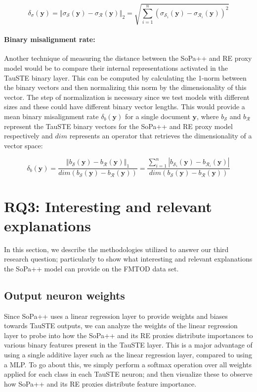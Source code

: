 \begin{equation}
  \delta_{\sigma}(\bm{y}) = \left\Vert \sigma_{\mathcal{S}}(\bm{y}) - \sigma_{\mathcal{R}}(\bm{y}) \right\Vert_{2} = \sqrt{\sum^n_{i=1} (\sigma_{\mathcal{S}_i}(\bm{y}) - \sigma_{\mathcal{R}_i}(\bm{y}))^2} 
\end{equation}

\paragraph{Binary misalignment rate:} Another technique of measuring the
distance between the SoPa++ and RE proxy model would be to compare their
internal representations activated in the TauSTE binary layer. This can be
computed by calculating the 1-norm between the binary vectors and then
normalizing this norm by the dimensionality of this vector. The step of
normalization is necessary since we test models with different sizes and these
could have different binary vector lengths. This would provide a mean binary
misalignment rate $\delta_b(\bm{y})$ for a single document $\bm{y}$, where
$b_{\mathcal{S}}$ and $b_{\mathcal{R}}$ represent the TauSTE binary vectors for
the SoPa++ and RE proxy model respectively and $dim$ represents an operator that
retrieves the dimensionality of a vector space:

\begin{equation}
  \delta_b(\bm{y}) = \dfrac{\left\Vert b_{\mathcal{S}}(\bm{y}) - b_{\mathcal{R}}(\bm{y}) \right\Vert_{1}}{dim(b_{\mathcal{S}}(\bm{y}) - b_{\mathcal{R}}(\bm{y}))} = \dfrac{\sum^n_{i=1} |b_{\mathcal{S}_i}(\bm{y}) - b_{\mathcal{R}_i}(\bm{y})|}{{dim(b_{\mathcal{S}}(\bm{y}) - b_{\mathcal{R}}(\bm{y}))}}
\end{equation}

\section{RQ3: Interesting and relevant explanations}

In this section, we describe the methodologies utilized to answer our third
research question; particularly to show what interesting and relevant
explanations the SoPa++ model can provide on the FMTOD data set.

\subsection{Output neuron weights}

Since SoPa++ uses a linear regression layer to provide weights and biases
towards TauSTE outputs, we can analyze the weights of the linear regression
layer to probe into how the SoPa++ and its RE proxies distribute importances to
various binary features present in the TauSTE layer. This is a major advantage
of using a single additive layer such as the linear regression layer, compared
to using a MLP. To go about this, we simply perform a softmax operation over all
weights applied for each class in each TauSTE neuron; and then visualize these
to observe how SoPa++ and its RE proxies distribute feature importance.

